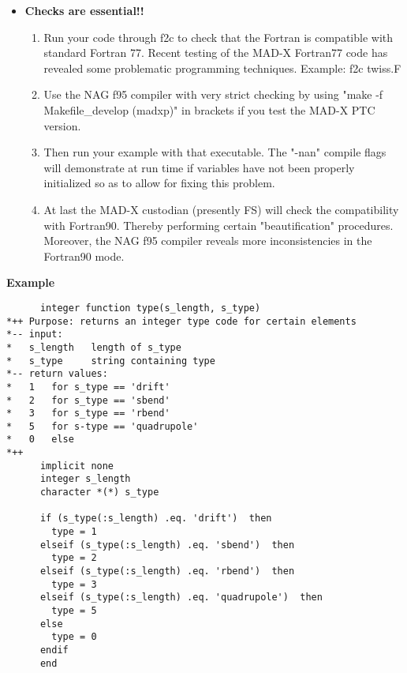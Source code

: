 \begin{itemize}
   \item \textbf{ Checks are essential!!}
     \begin{enumerate}
        \item  Run your code through f2c to check that the Fortran is
          compatible with standard Fortran 77. Recent testing of the
          MAD-X Fortran77 code has  revealed some problematic
          programming techniques. Example: f2c twiss.F   
	\item  Use the NAG f95 compiler with very strict checking by
          using "make -f Makefile\_develop (madxp)" in brackets if you
          test the MAD-X PTC version. 
	\item  Then run your example with that executable. The "-nan"
          compile flags will demonstrate at run time if variables have
          not been properly initialized so as to allow for fixing this
          problem.   
	\item  At last the MAD-X custodian (presently FS) will check the
          compatibility with Fortran90. Thereby performing certain
          "beautification" procedures. Moreover, the NAG f95 compiler
          reveals more inconsistencies in the Fortran90 mode.   
     \end{enumerate} 

\end{itemize}


\textbf{ Example}
\begin{verbatim}
      integer function type(s_length, s_type)
*++ Purpose: returns an integer type code for certain elements
*-- input:
*   s_length   length of s_type
*   s_type     string containing type
*-- return values:
*   1   for s_type == 'drift'
*   2   for s_type == 'sbend'
*   3   for s_type == 'rbend'
*   5   for s-type == 'quadrupole'
*   0   else
*++
      implicit none
      integer s_length
      character *(*) s_type

      if (s_type(:s_length) .eq. 'drift')  then
        type = 1
      elseif (s_type(:s_length) .eq. 'sbend')  then
        type = 2
      elseif (s_type(:s_length) .eq. 'rbend')  then
        type = 3
      elseif (s_type(:s_length) .eq. 'quadrupole')  then
        type = 5
      else
        type = 0
      endif
      end
\end{verbatim}


